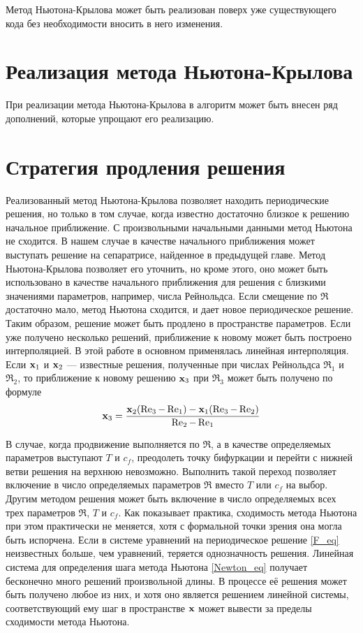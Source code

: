 Метод Ньютона-Крылова может быть реализован поверх уже существующего кода без необходимости вносить в него изменения. 

\section{Реализация метода Ньютона-Крылова}

При реализации метода Ньютона-Крылова в алгоритм может быть внесен ряд дополнений, которые упрощают его реализацию. 


\section{Стратегия продления решения}

Реализованный метод Ньютона-Крылова позволяет находить периодические решения, но только в том случае, когда известно достаточно близкое к решению начальное приближение. С произвольными начальными данными метод Ньютона не сходится. В нашем случае в качестве начального приближения может выступать решение на сепаратрисе, найденное в предыдущей главе. Метод Ньютона-Крылова позволяет его уточнить, но кроме этого, оно может быть использовано в качестве начального приближения для решения с близкими значениями параметров, например, числа Рейнольдса. Если смещение по $\Re$ достаточно мало, метод Ньютона сходится, и дает новое периодическое решение. Таким образом, решение может быть продлено в пространстве параметров. Если уже получено несколько решений, приближение к новому может быть построено интерполяцией. В этой работе в основном применялась линейная интерполяция. Если $\mathbf{x}_1$ и $\mathbf{x}_2$ --- известные решения, полученные при числах Рейнольдса $\Re_1$ и $\Re_2$, то приближение к новому решению $\mathbf{x}_3$ при $\Re_3$ может быть получено по формуле 
\begin{equation}
\mathbf{x}_3 = \frac{\mathbf{x}_2(\operatorname{Re}_3 - \operatorname{Re}_1) - \mathbf{x}_1(\operatorname{Re}_3-\operatorname{Re}_2)}{\operatorname{Re}_2 - \operatorname{Re}_1}
\end{equation}

В случае, когда продвижение выполняется по $\Re$, а в качестве определяемых параметров выступают $T$ и $c_f$, преодолеть точку бифуркации и перейти с нижней ветви решения на верхнюю невозможно. Выполнить такой переход позволяет включение в число определяемых параметров $\Re$ вместо $T$ или $c_f$ на выбор. Другим методом решения может быть включение в число определяемых всех трех параметров $\Re$, $T$ и $c_f$. Как показывает практика, сходимость метода Ньютона при этом практически не меняется, хотя с формальной точки зрения она могла быть испорчена. Если в системе уравнений на периодическое решение \eqref{F_eq} неизвестных больше, чем уравнений, теряется однозначность решения. Линейная система для определения шага метода Ньютона \eqref{Newton_eq} получает бесконечно много решений произвольной длины. В процессе её решения может быть получено любое из них, и хотя оно является решением линейной системы, соответствующий ему шаг в пространстве $\mathbf{x}$ может вывести за пределы сходимости метода Ньютона. 


